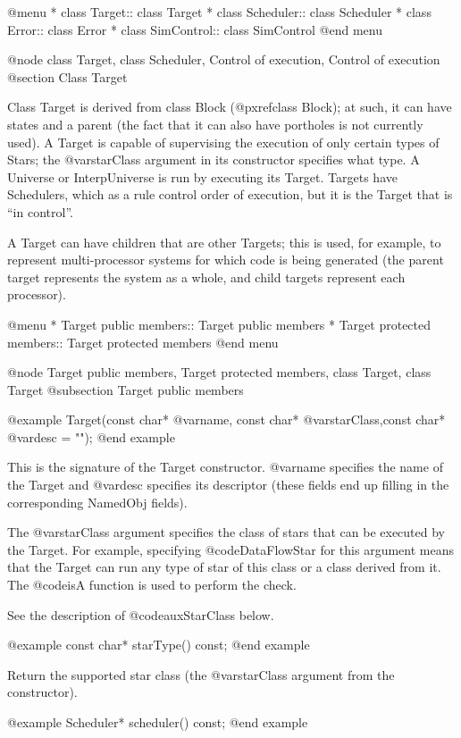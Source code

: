 @menu
* class Target::                class Target
* class Scheduler::             class Scheduler
* class Error::                 class Error
* class SimControl::            class SimControl
@end menu

@node class Target, class Scheduler, Control of execution, Control of execution
@section Class Target

Class Target is derived from class Block (@pxref{class Block});
at such, it can have states
and a parent (the fact that it can also have portholes is not currently
used).  A Target is capable of supervising the execution of only certain
types of Stars; the @var{starClass} argument in its constructor
specifies what type.  A Universe or InterpUniverse is run by executing
its Target.  Targets have Schedulers, which as a rule control order of
execution, but it is the Target that is ``in control''.

A Target can have children that are other Targets; this is used, for
example, to represent multi-processor systems for which code is being
generated (the parent target represents the system as a whole, and
child targets represent each processor).

@menu
* Target public members::       Target public members
* Target protected members::    Target protected members
@end menu

@node Target public members, Target protected members, class Target, class Target
@subsection Target public members

@example
Target(const char* @var{name}, const char* @var{starClass},const char* @var{desc} = "");
@end example

This is the signature of the Target constructor. @var{name} specifies
the name of the Target and @var{desc} specifies its descriptor (these
fields end up filling in the corresponding NamedObj fields).

The @var{starClass} argument specifies the class of stars that can be
executed by the Target.  For example, specifying @code{DataFlowStar}
for this argument means that the Target can run any type of star of
this class or a class derived from it.  The @code{isA} function is
used to perform the check.

See the description of @code{auxStarClass} below.

@example
const char* starType() const;
@end example

Return the supported star class (the @var{starClass} argument from
the constructor).

@example
Scheduler* scheduler() const;
@end example

